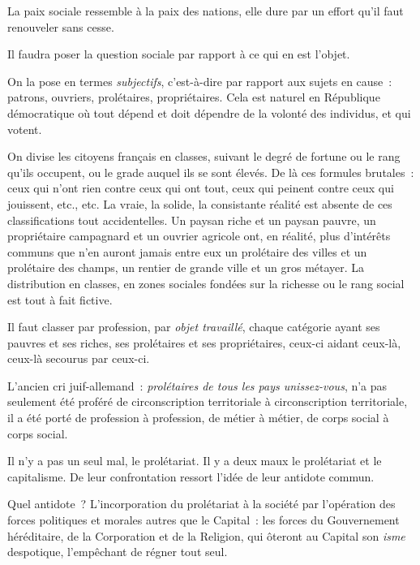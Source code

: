 \documentclass[french,twoside]{book} %
\newcommand{\astermono}{\medskip\centerline{\color{rubric}\large\selectfont{\syms ✻}}\medskip\par}%
\begin{document}
\astermono

\noindent La paix sociale ressemble à la paix des nations, elle dure par un effort qu’il faut renouveler sans cesse.\par

\astermono

\noindent Il faudra poser la question sociale par rapport à ce qui en est l’objet.\par
On la pose en termes \emph{subjectifs}, c’est-à-dire par rapport aux sujets en cause : patrons, ouvriers, prolétaires, propriétaires. Cela est naturel en République démocratique où tout dépend et doit dépendre de la volonté des individus, et qui votent.\par
On divise les citoyens français en classes, suivant le degré de fortune ou le rang qu’ils occupent, ou le grade auquel ils se sont élevés. De là ces formules brutales : ceux qui n’ont rien contre ceux qui ont tout, ceux qui peinent contre ceux qui jouissent, etc., etc. La vraie, la solide, la consistante réalité est absente de ces classifications tout accidentelles. Un paysan riche et un paysan pauvre, un propriétaire campagnard et un ouvrier agricole ont, en réalité, plus d’intérêts communs que n’en auront jamais entre eux un prolétaire des villes et un prolétaire des champs, un rentier de grande ville et un gros métayer. La distribution en classes, en zones sociales fondées sur la richesse ou le rang social est tout à fait fictive.\par
Il faut classer par profession, par \emph{objet travaillé}, chaque catégorie ayant ses pauvres et ses riches, ses prolétaires et ses propriétaires, ceux-ci aidant ceux-là, ceux-là secourus par ceux-ci.\par
L’ancien cri juif-allemand : \emph{prolétaires de tous les pays unissez-vous}, n’a pas seulement été proféré de circonscription territoriale à circonscription territoriale, il a été porté de profession à profession, de métier à métier, de corps social à corps social.\par

\astermono

\noindent Il n’y a pas un seul mal, le prolétariat. Il y a deux maux le prolétariat et le capitalisme. De leur confrontation ressort l’idée de leur antidote commun.\par
Quel antidote ? L’incorporation du prolétariat à la société par l’opération des forces politiques et morales autres que le Capital : les forces du Gouvernement héréditaire, de la Corporation et de la Religion, qui ôteront au Capital son \emph{isme} despotique, l’empêchant de régner tout seul.
\end{document}
